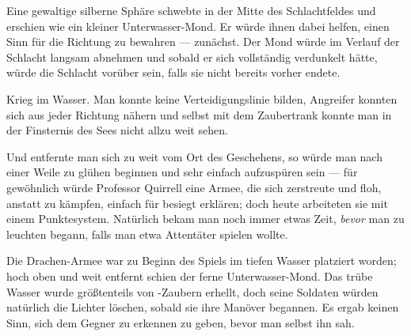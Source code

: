Eine gewaltige silberne Sphäre schwebte in der Mitte des Schlachtfeldes und erschien wie ein kleiner Unterwasser-Mond. Er würde ihnen dabei helfen, einen Sinn für die Richtung zu bewahren — zunächst. Der Mond würde im Verlauf der Schlacht langsam abnehmen und sobald er sich vollständig verdunkelt hätte, würde die Schlacht vorüber sein, falls sie nicht bereits vorher endete.

Krieg im Wasser. Man konnte keine Verteidigungslinie bilden, Angreifer konnten sich aus jeder Richtung nähern und selbst mit dem Zaubertrank konnte man in der Finsternis des Sees nicht allzu weit sehen.

Und entfernte man sich zu weit vom Ort des Geschehens, so würde man nach einer Weile zu glühen beginnen und sehr einfach aufzuspüren sein — für gewöhnlich würde Professor Quirrell eine Armee, die sich zerstreute und floh, anstatt zu kämpfen, einfach für besiegt erklären; doch heute arbeiteten sie mit einem Punktesystem. Natürlich bekam man noch immer etwas Zeit, \emph{bevor} man zu leuchten begann, falls man etwa Attentäter spielen wollte.

Die Drachen-Armee war zu Beginn des Spiels im tiefen Wasser platziert worden; hoch oben und weit entfernt schien der ferne Unterwasser-Mond. Das trübe Wasser wurde größtenteils von -Zaubern erhellt, doch seine Soldaten würden natürlich die Lichter löschen, sobald sie ihre Manöver begannen. Es ergab keinen Sinn, sich dem Gegner zu erkennen zu geben, bevor man selbst ihn sah.

